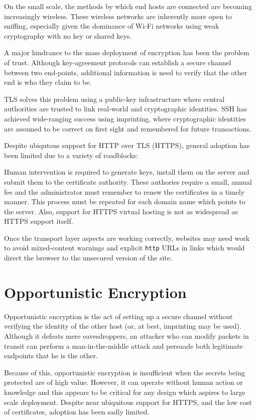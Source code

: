 \documentclass[conference]{IEEEtran}
\begin{document}
On the small scale, the methods by which end hosts are connected are becoming
increasingly wireless. These wireless networks are inherently more open to
sniffing, especially given the dominance of Wi-Fi networks using weak
cryptography\cite{wep} with no key or shared keys.

A major hindrance to the mass deployment of encryption has been the problem of
trust. Although key-agreement protocols can establish a secure channel between
two end-points, additional information is need to verify that the other end is
who they claim to be.

TLS\cite{tls} solves this problem using a public-key infrastructure where
central authorities are trusted to link real-world and cryptographic
identities. SSH has achieved wide-ranging success using imprinting, where
cryptographic identities are assumed to be correct on first sight and
remembered for future transactions.

Despite ubiqutous support for HTTP over TLS (HTTPS), general adoption has been
limited due to a variety of roadblocks:

Human intervention is required to generate keys, install them on the server and
submit them to the certificate authority. These authories require a small,
annual fee and the administrator must remember to renew the certificates in
a timely manner. This process must be repeated for each domain name which points
to the server. Also, support for HTTPS virtual hosting\cite{tlssni} is not as
widespread as HTTPS support itself.

Once the transport layer aspects are working correctly, websites may need work
to avoid mixed-content warnings and explicit {\tt http} URLs in links which
would direct the browser to the unsecured version of the site.

\section{Opportunistic Encryption}

Opportunistic encryption is the act of setting up a secure channel without
verifying the identity of the other host (or, at best, imprinting may be used).
Although it defeats mere eavesdroppers, an attacker who can modify packets in
transit can perform a man-in-the-middle attack and persuade both legitimate
endpoints that he is the other.

Because of this, opportunistic encryption is insufficient when the secrets
being protected are of high value. However, it can operate without human
action or knowledge and this appears to be critical for any design which
aspires to large scale deployment. Despite near ubiquitous support for HTTPS,
and the low cost of certificates, adoption has been sadly limited.
\end{document}
